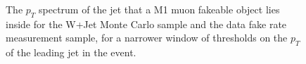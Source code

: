 \begin{figure}[!htbp]
\begin{center}
\caption{The $p_{T}$ spectrum of the jet that a M1 muon fakeable object lies inside for the 
W+Jet Monte Carlo sample and the data fake rate measurement sample, for a narrower window of thresholds
on the $p_{T}$ of the leading jet in the event.}
\label{fig:mu_M1_fr_jetspectrumNarrowerWindow}
\end{center}
\end{figure}

